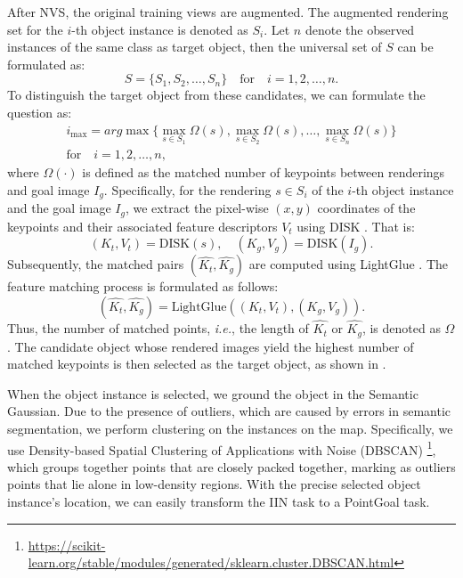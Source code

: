 After NVS, the original training views are augmented. The augmented rendering set for the $i$-th object instance is denoted as $S_i$. Let $n$ denote the observed instances of the same class as target object, then the universal set of $S$ can be formulated as:
\begin{equation}
    S = \{S_1, S_2, \ldots, S_n\}  \quad \text{for} \quad i=1,2,\ldots,n.
\end{equation}
To distinguish the target object from these candidates, we can formulate the question as:
\begin{equation}
\begin{split}
      i_{\text{max}} = arg\max \{ \max_{s \in S_1} \Omega (s), \max_{s \in S_2} \Omega (s), \ldots, \max_{s \in S_n} \Omega (s) \} \\
      \text{for} \quad i=1,2,\ldots,n,
    \label{eq:match}  
\end{split}
\end{equation}
where $\Omega (\cdot)$ is defined as the matched number of keypoints between renderings and goal image $I_g$. Specifically, for the rendering $s \in S_i$ of the $i$-th object instance and the goal image $I_g$, we extract the pixel-wise $(x, y)$ coordinates of the keypoints and their associated feature descriptors $V_t$ using DISK \cite{tyszkiewicz2020disk}. That is:
\begin{equation}
(K_t, V_t) = \text{DISK}(s), \quad (K_g, V_g) = \text{DISK}(I_g).
\label{eq:feature1}
\end{equation}
Subsequently, the matched pairs $(\hat{K_t}, \hat{K_g})$ are computed using LightGlue \cite{lindenberger2023lightglue}. The feature matching process is formulated as follows:
\begin{equation}
(\hat{K_t}, \hat{K_g}) = \text{LightGlue}((K_t, V_t), (K_g, V_g)).
\label{eq:matching}
\end{equation}
Thus, the number of matched points, \textit{i.e.}, the length of $\hat{K_t}$ or $\hat{K_g}$, is denoted as $\Omega$. The candidate object whose rendered images yield the highest number of matched keypoints is then selected as the target object, as shown in . 


When the object instance is selected, we ground the object in the Semantic Gaussian. Due to the presence of outliers, which are caused by errors in semantic segmentation, we perform clustering on the instances on the map. Specifically, we use Density-based Spatial Clustering of Applications with Noise (DBSCAN) \footnote{\url{https://scikit-learn.org/stable/modules/generated/sklearn.cluster.DBSCAN.html}}, which groups together points that are closely packed together, marking as outliers points that lie alone in low-density regions. With the precise selected object instance's location, we can easily transform the IIN task to a PointGoal task.


